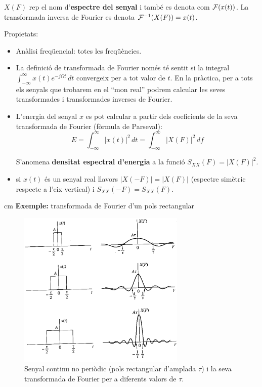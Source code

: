 \documentclass{article}
\begin{document}
\begin{description}
\noindent $X(F)$ rep el nom d'\textbf{espectre del senyal} i tamb\'e es denota com ${\cal F}(x(t))$.
La transformada inversa de Fourier es denota ${\cal F}^{-1}(X(F))=x(t)$.

\noindent
Propietats:
\begin{itemize}
\item An\`alisi freq\"uencial: totes les freq\"u\`encies.

\item La definici\'o de transformada de Fourier nom\'es t\'e sentit si la integral 
$\int_{-\infty}^{\infty} x(t) e^{-j \Omega t} \, dt$ convergeix per a tot valor de $t$.
En la pr\`actica, per a tots els senyals que trobarem en el ``mon real'' podrem calcular
les seves transformades i transformades inverses de Fourier.
\item L'energia del senyal $x$ es pot calcular a partir dels coeficients de la seva transformada de Fourier
(f\`ormula de Parseval):
\[
E=\int_{-\infty}^\infty |x(t)|^2 \, dt = \int_{-\infty}^\infty |X(F)|^2 \, df
\]

S'anomena \textbf{densitat espectral d'energia} a la funci\'o $S_{XX}(F)=|X(F)|^2$.

\item si $x(t)$ \'es un senyal real llavors $|X(-F)|=|X(F)|$ (espectre sim\`etric respecte a l'eix vertical)
i $S_{XX}(-F)=S_{XX}(F)$.


\end{itemize}

 cm
\noindent
\textbf{Exemple:} transformada de Fourier d'un pols rectangular

\begin{figure}[htbp]
\begin{center}
\includegraphics[width=8cm]{polsrectitransfF2.png} 
\end{center}
\caption{Senyal continu no peri\`odic (pols rectangular d'amplada $\tau$) i la
seva transformada de Fourier per a diferents valors de $\tau$.}
\end{figure}


\end{description}
\end{document}
